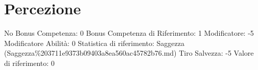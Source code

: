 \section{Percezione}\label{percezione}

\begin{description}
\tightlist
\item[Tags: ABI]
No Bonus Competenza: 0 Bonus Competenza di Riferimento: 1 Modificatore:
-5 Modificatore Abilità: 0 Statistica di riferimento: Saggezza
(Saggezza\%203711e9373b09403a8ea560ac45782b76.md) Tiro Salvezza: -5
Valore di riferimento: 0
\end{description}
